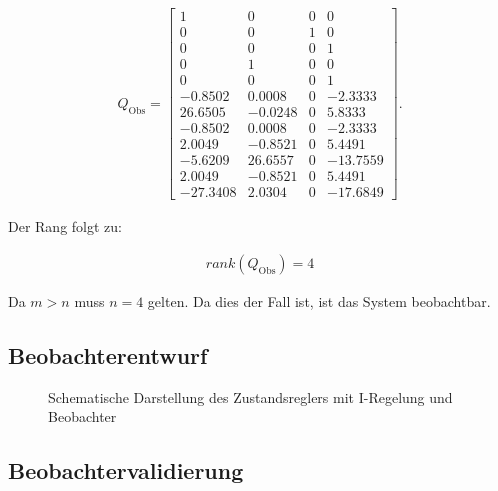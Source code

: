 \begin{align}
    Q_{\mathrm{Obs}} = 
    \begin{bmatrix}
        1 & 0 & 0 & 0 \\
        0 & 0 & 1 & 0 \\
        0 & 0 & 0 & 1 \\
        0 & 1 & 0 & 0 \\
        0 & 0 & 0 & 1 \\
        -0.8502 & 0.0008 & 0 & -2.3333 \\
       26.6505 & -0.0248 & 0 & 5.8333 \\
       -0.8502 & 0.0008 & 0 & -2.3333 \\
        2.0049 & -0.8521 & 0 & 5.4491 \\
       -5.6209 & 26.6557 & 0 & -13.7559 \\
        2.0049 & -0.8521 & 0 & 5.4491 \\
      -27.3408 & 2.0304 & 0 & -17.6849
    \end{bmatrix}.
\end{align}

Der Rang folgt zu:

\begin{align}
    rank(Q_{\mathrm{Obs}}) = 4
\end{align}

Da $m > n$ muss $n = 4$ gelten. Da dies der Fall ist, ist das System beobachtbar.

\subsection{Beobachterentwurf}

\begin{figure}[H]
    \centering
    \caption[Reglerstruktur mit Beobachter]{Schematische Darstellung des Zustandsreglers mit I-Regelung und Beobachter}
    \label{fig:Bild45}
\end{figure}

\subsection{Beobachtervalidierung}
